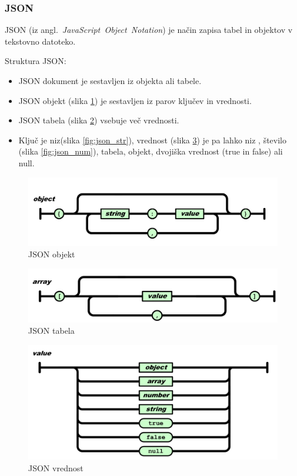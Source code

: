 \documentclass[12pt]{report}
\newcommand{\anglimp}[1]{angl.~\emph{#1}}
\begin{document}
			\subsubsection{JSON}
				JSON (iz \anglimp{JavaScript~Object~Notation}) je način zapisa tabel in objektov v tekstovno datoteko.~\cite{json}\\
				{Struktura JSON:~\cite{json}
				\begin{itemize}
					\item JSON dokument je sestavljen iz objekta ali tabele.
					\item JSON objekt (slika \ref{fig:json_obj}) je sestavljen iz parov ključev in vrednosti.
					\item JSON tabela (slika \ref{fig:json_arr}) vsebuje več vrednosti.
					\item Ključ je niz(slika \ref{fig:json_str}), vrednost (slika \ref{fig:json_val}) je pa lahko niz , število (slika \ref{fig:json_num}), tabela, objekt, dvojiška vrednost (true in false) ali null.
				\end{itemize}}
			\begin{figure}[H]
				\centering
				\includegraphics[width=\textwidth]{json_object.png}
				\caption{JSON objekt~\cite{ecma404}}
				\label{fig:json_obj}
			\end{figure}
			\begin{figure}[H]
				\centering
				\includegraphics[width=\textwidth]{json_array.png}
				\caption{JSON tabela~\cite{ecma404}}
				\label{fig:json_arr}
			\end{figure}
			\begin{figure}[H]
				\centering
				\includegraphics[width=\textwidth]{json_value.png}
				\caption{JSON vrednost~\cite{ecma404}}
				\label{fig:json_val}
			\end{figure}
\end{document}

